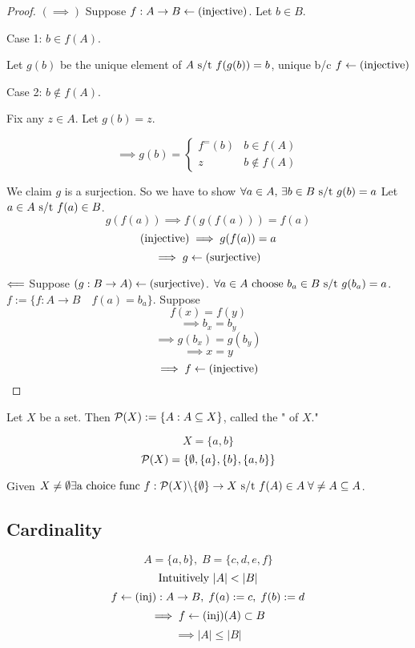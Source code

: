 \documentclass[12pt]{article}
\begin{document}
\bboxproof
\begin{proof}
  \((\implies)\) Suppose \(f:A\to B\leftarrow(\text{injective})\). Let \(b\in B\).
  
  Case 1: \(b\in f(A)\). 

  Let \(g(b)\) be the unique element of \(A\text{ s/t } f(g(b))=b\), unique b/c 
  \(f\leftarrow(\mathrm{injective})\)

  Case 2: \(b\not\in f(A)\).

  Fix any \(z\in A\). Let \(g(b)=z\).
  
  \begin{equation*}
    \implies g(b)=\begin{cases}f^{=}(b)&b\in f(A)\\ z&b\not\in f(A)\end{cases}
  \end{equation*}

  We claim \(g\) is a surjection. 
  So we have to show
  \(\forall a\in A,\,\exists b\in B\text{ s/t } g(b)=a\)
  Let \(a\in A\text{ s/t } f(a)\in B\).
  \[g(f(a))\implies f(g(f(a)))=f(a)\]
  \[(\mathrm{injective})\implies g(f(a))=a\]
  \[\implies g\leftarrow(\mathrm{surjective})\]

  \(\Longleftarrow\) Suppose \((g:B\to A)\leftarrow(\mathrm{surjective})\).
  \(\forall a\in A\text{ choose }b_a\in B\text{ s/t } g(b_a)=a\).
  \(f:=\{f:A\to B\quad f(a)=b_a\}\). Suppose
  \[f(x)=f(y)\]
  \[\implies b_x=b_y\]
  \[\implies g(b_x)=g(b_y)\]
  \[\implies x=y\]
  \[\implies f\leftarrow(\mathrm{injective})\]
\end{proof}
\ebox



\bbox
\begin{defn}[Powerset]
  Let \(X\) be a set. Then \(\mathcal P(X):=\{A:A\subseteq X\}\), called
  the " of \(X\)."
\end{defn}
\ebox

\bboxex
\[X=\{a,b\}\]
\[\mathcal P(X)=\{\emptyset,\{a\},\{b\},\{a,b\}\}\]
\ebox


\bbox
\begin{axim}[Choice]\label{axim:choice}
  Given \(X\neq\emptyset\exists\T{a choice func }f:\PP(X)\backslash
  \{\emptyset\}\to X\st f(A)\in A\;\forall\empty\neq A\subseteq A\).
\end{axim}
\ebox

\subsection{Cardinality}
\bboxex
\[A=\{a,b\},\;B=\{c,d,e,f\}\]
\[\T{Intuitively }|A|<|B|\]
\[f\leftarrow(\mathrm{inj}):A\to B,\;f(a):=c,\;f(b):=d\]
\[\implies f\leftarrow(\mathrm{inj})(A)\subset B\]
\[\implies |A|\le |B|\]
\ebox
\end{document}
